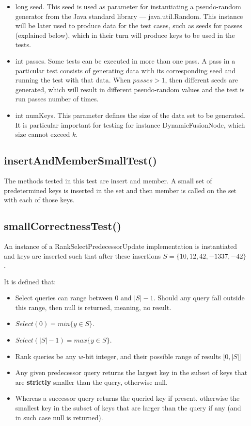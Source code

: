 \begin{itemize}
    \item {\ttfamily long seed}. This seed is used as parameter for instantiating a pseudo-random generator from the Java standard library --- {\ttfamily java.util.Random}. This instance will be later used to produce data for the test cases, such as seeds for passes (explained below), which in their turn will produce keys to be used in the tests.
    \item {\ttfamily int passes}. Some tests can be executed in more than one pass. A pass in a particular test consists of generating data with its corresponding seed and running the test with that data. When $passes > 1$, then different seeds are generated, which will result in different pseudo-random values and the test is run {\ttfamily passes} number of times.
    \item {\ttfamily int numKeys}. This parameter defines the size of the data set to be generated. It is particular important for testing for instance {\ttfamily DynamicFusionNode}, which size cannot exceed $k$.
\end{itemize}

\subsection{{\ttfamily insertAndMemberSmallTest()}}
The methods tested in this test are {\ttfamily insert} and {\ttfamily member}. A small set of predetermined keys is inserted in the set and then {\ttfamily member} is called on the set with each of those keys. 

\subsection{{\ttfamily smallCorrectnessTest()}}

An instance of a {\ttfamily RankSelectPredecessorUpdate} implementation is instantiated and keys are inserted such that after these insertions $S = \{10, 12, 42, -1337, -42\}$.

It is defined that:
\begin{itemize}
    \item Select queries can range between $0$ and $|S|-1$. Should any query fall outside this range, then {\ttfamily null} is returned, meaning, no result.
    \item $Select(0) = min\{y \in S \}$.
    \item $Select(|S|-1) = max\{y \in S\}$.
    \item Rank queries be any $w$-bit integer, and their possible range of results $\big[ 0, |S| \big]$
    \item Any given predecessor query returns the largest key in the subset of keys that are \textbf{strictly} smaller than the query, otherwise {\ttfamily null}.
    \item Whereas a successor query returns the queried key if present, otherwise the smallest key in the subset of keys that are larger than the query if any (and in such case {\ttfamily null} is returned).
\end{itemize}

